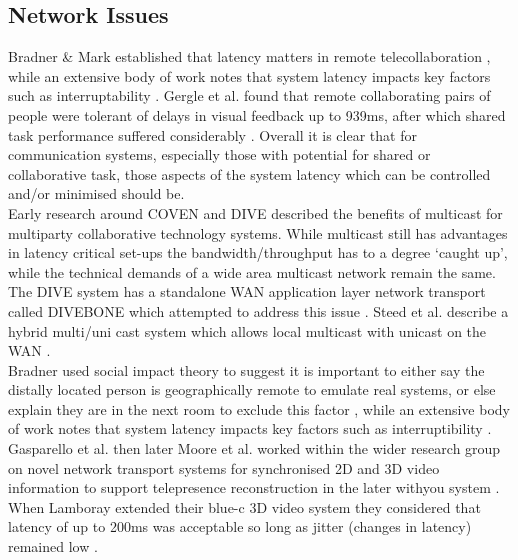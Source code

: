               \subsection{Network Issues}
            Bradner \& Mark established that latency matters in remote telecollaboration \cite{Bradner:2002:WDM:587078.587110}, while an extensive body of work notes that system latency impacts key factors such as interruptability \cite{Avrahami2007}. Gergle et al. found that remote collaborating pairs of people were tolerant of delays in visual feedback up to 939ms, after which shared task performance suffered considerably \cite{Gergle2006}. Overall it is clear that for communication systems, especially those with potential for shared or collaborative task, those aspects of the system latency which can be controlled and/or minimised should be.\\
             Early research around COVEN and DIVE described the benefits of multicast for multiparty collaborative technology systems. While multicast still has advantages in latency critical set-ups the bandwidth/throughput has to a degree `caught up', while the technical demands of a wide area multicast network remain the same. The DIVE system has a standalone WAN application layer network transport called DIVEBONE which attempted to address this issue \cite{Greenhalgh2001a}. Steed et al. describe a hybrid multi/uni cast system which allows local multicast with unicast on the WAN \cite{Greenhalgh2001}.\\
              Bradner used social impact theory to suggest  it is important to either say the distally located person is geographically remote to emulate real systems, or else explain they are in the next room to exclude this factor \cite{Bradner:2002:WDM:587078.587110}, while an extensive body of work notes that system latency impacts key factors such as interruptibility \cite{Avrahami2007}.\\
         Gasparello et al. \cite{Gasparello:2011in} then later Moore et al. \cite{Moore:2010jt} worked within the wider research group on novel network transport systems for synchronised 2D and 3D video information to support telepresence reconstruction in the later withyou system \cite{Roberts2015}. \\
       When Lamboray extended their blue-c 3D video system they considered that latency of up to 200ms was acceptable so long as jitter (changes in latency) remained low \cite{Park1999, lamboray2005data}.
       
